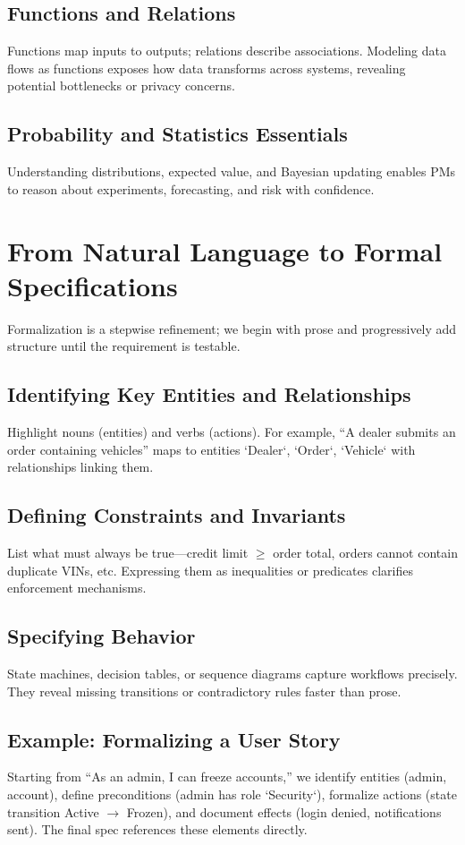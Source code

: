 \subsection{Functions and Relations}
Functions map inputs to outputs; relations describe associations. Modeling data flows as functions exposes how data transforms across systems, revealing potential bottlenecks or privacy concerns.

\subsection{Probability and Statistics Essentials}
Understanding distributions, expected value, and Bayesian updating enables PMs to reason about experiments, forecasting, and risk with confidence.

\section{From Natural Language to Formal Specifications}
\label{sec:nl-to-formal}

Formalization is a stepwise refinement; we begin with prose and progressively add structure until the requirement is testable.

\subsection{Identifying Key Entities and Relationships}
Highlight nouns (entities) and verbs (actions). For example, ``A dealer submits an order containing vehicles'' maps to entities `Dealer`, `Order`, `Vehicle` with relationships linking them.

\subsection{Defining Constraints and Invariants}
List what must always be true—credit limit $\ge$ order total, orders cannot contain duplicate VINs, etc. Expressing them as inequalities or predicates clarifies enforcement mechanisms.

\subsection{Specifying Behavior}
State machines, decision tables, or sequence diagrams capture workflows precisely. They reveal missing transitions or contradictory rules faster than prose.

\subsection{Example: Formalizing a User Story}
Starting from ``As an admin, I can freeze accounts,'' we identify entities (admin, account), define preconditions (admin has role `Security`), formalize actions (state transition Active $\rightarrow$ Frozen), and document effects (login denied, notifications sent). The final spec references these elements directly.

